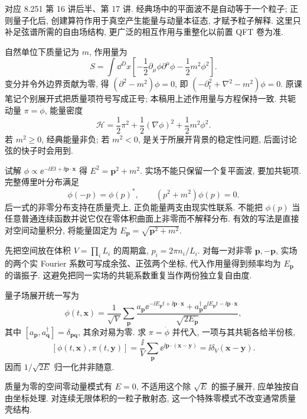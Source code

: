 \label{ch:basic-particles}
对应 8.251 第 16 讲后半、第 17 讲. 经典场中的平面波不是自动等于一个粒子; 正则量子化后, 创建算符作用于真空产生能量与动量本征态, 才赋予粒子解释. 这里只补足弦谱所需的自由场结构, 更广泛的相互作用与重整化以前置 QFT 卷为准.

自然单位下质量记为 $m$, 作用量为
\[
 S=\int\dd^Dx\left[-\frac12\partial_\mu\phi\partial^\mu\phi
 -\frac12m^2\phi^2\right].
\]
变分并令外边界贡献为零, 得 $(\partial^2-m^2)\phi=0$, 即
$(-\partial_t^2+\nabla^2-m^2)\phi=0$. 原课笔记个别展开式把质量项符号写成正号; 本稿用上述作用量与方程保持一致. 共轭动量 $\pi=\dot\phi$, 能量密度
\[
 \mathcal H=\frac12\pi^2+\frac12(\nabla\phi)^2+\frac12m^2\phi^2.
\]
若 $m^2\geq0$, 经典能量非负; 若 $m^2<0$, 是关于所展开背景的稳定性问题, 后面讨论弦的快子时会用到.

试解 $\phi\propto\ee^{-\ii Et+\ii\boldsymbol p\cdot\boldsymbol x}$ 得
$E^2=\boldsymbol p^2+m^2$. 实场不能只保留一个复平面波, 要加共轭项. 完整傅里叶分布满足
\[
 \phi(-p)=\phi(p)^*,\qquad(p^2+m^2)\phi(p)=0.
\]
后一式的非零分布支持在质量壳上, 正负能量两支由现实性联系. 不能把 $\phi(p)$ 当任意普通连续函数并说它仅在零体积曲面上非零而不解释分布. 有效的写法是直接对空间动量积分, 将能量固定为 $E_{\boldsymbol p}=\sqrt{\boldsymbol p^2+m^2}$.

先把空间放在体积 $V=\prod_iL_i$ 的周期盒, $p_i=2\pi n_i/L_i$. 对每一对非零 $\boldsymbol p,-\boldsymbol p$, 实场的两个实 Fourier 系数可写成余弦、正弦两个坐标, 代入作用量得到频率均为 $E_{\boldsymbol p}$ 的谐振子. 这避免把同一实场的共轭系数重复当作两份独立复自由度.

量子场展开统一写为
\[
 \phi(t,\boldsymbol x)=\frac1{\sqrt V}\sum_{\boldsymbol p}
 \frac{a_{\boldsymbol p}\ee^{-\ii E_{\boldsymbol p}t+\ii\boldsymbol p\cdot\boldsymbol x}
 +a_{\boldsymbol p}^\dagger\ee^{\ii E_{\boldsymbol p}t-\ii\boldsymbol p\cdot\boldsymbol x}}
 {\sqrt{2E_{\boldsymbol p}}},
\]
其中 $[a_{\boldsymbol p},a_{\boldsymbol q}^\dagger]=\delta_{\boldsymbol p\boldsymbol q}$, 其余对易为零. 求 $\pi=\dot\phi$ 并代入, 一项与其共轭各给半份核,
\[
 [\phi(t,\boldsymbol x),\pi(t,\boldsymbol y)]
 =\frac\ii V\sum_{\boldsymbol p}\ee^{\ii\boldsymbol p\cdot(\boldsymbol x-\boldsymbol y)}
 =\ii\delta_V(\boldsymbol x-\boldsymbol y).
\]
因而 $1/\sqrt{2E}$ 归一化并非随意.

质量为零的空间零动量模式有 $E=0$, 不适用这个除 $\sqrt E$ 的振子展开, 应单独按自由坐标处理. 对连续无限体积的一粒子散射态, 这一个特殊零模式不改变通常质量壳结构.

